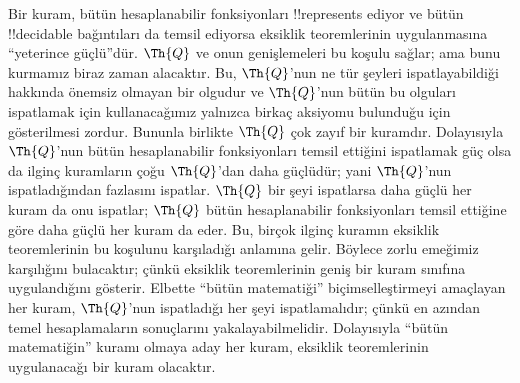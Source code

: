 Bir kuram, bütün hesaplanabilir fonksiyonları !!{represents} ediyor ve bütün
!!{decidable} bağıntıları da temsil ediyorsa eksiklik teoremlerinin
uygulanmasına ``yeterince güçlü''dür. $\Th{Q}$ ve onun genişlemeleri bu koşulu sağlar;
ama bunu kurmamız biraz zaman alacaktır. Bu, $\Th{Q}$'nun ne tür şeyleri
ispatlayabildiği hakkında önemsiz olmayan bir olgudur ve $\Th{Q}$'nun bütün
bu olguları ispatlamak için kullanacağımız yalnızca birkaç aksiyomu bulunduğu
için gösterilmesi zordur. Bununla birlikte $\Th{Q}$ çok zayıf bir kuramdır.
Dolayısıyla $\Th{Q}$'nun bütün hesaplanabilir fonksiyonları temsil ettiğini
ispatlamak güç olsa da ilginç kuramların çoğu $\Th{Q}$'dan daha güçlüdür;
yani $\Th{Q}$'nun ispatladığından fazlasını ispatlar. $\Th{Q}$ bir şeyi
ispatlarsa daha güçlü her kuram da onu ispatlar; $\Th{Q}$ bütün
hesaplanabilir fonksiyonları temsil ettiğine göre daha güçlü her kuram da
eder. Bu, birçok ilginç kuramın eksiklik teoremlerinin bu koşulunu karşıladığı
anlamına gelir. Böylece zorlu emeğimiz karşılığını bulacaktır; çünkü
eksiklik teoremlerinin geniş bir kuram sınıfına uygulandığını gösterir.
Elbette ``bütün matematiği'' biçimselleştirmeyi amaçlayan her kuram,
$\Th{Q}$'nun ispatladığı her şeyi ispatlamalıdır; çünkü en azından temel
hesaplamaların sonuçlarını yakalayabilmelidir. Dolayısıyla ``bütün
matematiğin'' kuramı olmaya aday her kuram, eksiklik teoremlerinin
uygulanacağı bir kuram olacaktır.

